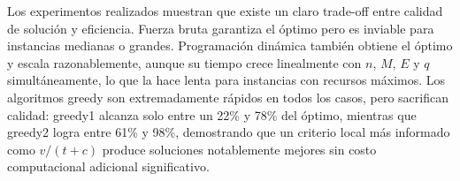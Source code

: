 Los experimentos realizados muestran que existe un claro trade-off entre calidad de solución y eficiencia. Fuerza bruta garantiza el óptimo pero es inviable para instancias medianas o grandes. Programación dinámica también obtiene el óptimo y escala razonablemente, aunque su tiempo crece linealmente con $n$, $M$, $E$ y $q$ simultáneamente, lo que la hace lenta para instancias con recursos máximos. Los algoritmos greedy son extremadamente rápidos en todos los casos, pero sacrifican calidad: greedy1 alcanza solo entre un 22\% y 78\% del óptimo, mientras que greedy2 logra entre 61\% y 98\%, demostrando que un criterio local más informado como $v/(t+c)$ produce soluciones notablemente mejores sin costo computacional adicional significativo.